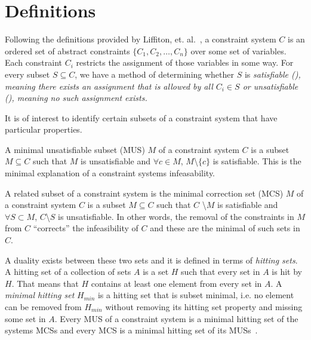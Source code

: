 \section{Definitions}
\label{sec:defs}
Following the definitions provided by Liffiton, et. al.~\cite{liffiton2016fast}, a constraint system $C$ is an ordered set of abstract constraints $\{C_1, C_2,\dots,C_n \}$ over some set of variables. Each constraint $C_i$ restricts the assignment of those variables in some way. For every subset $S \subseteq C$, we have a method of determining whether $S$ is \em{satisfiable} (\sat), meaning there exists an assignment that is allowed by all $C_i \in S$ or \em{unsatisfiable} (\unsat), meaning no such assignment exists. 

It is of interest to identify certain subsets of a constraint system that have particular properties. 

A minimal unsatisfiable subset (MUS) $M$ of a constraint system $C$ is a subset $M \subseteq C$ such that  $M$ is unsatisfiable and $\forall c \in M$, $M$\textbackslash $\{c\}$ is satisfiable. This is the minimal explanation of a constraint systems infeasability. 

A related subset of a constraint system is the minimal correction set (MCS) $M$ of a constraint system $C$ is a subset $M \subseteq C$ such that  $C$ \textbackslash $M$ is satisfiable and $\forall S \subset M$, $C$\textbackslash $S$ is unsatisfiable. In other words, the removal of the constraints in $M$ from $C$ ``corrects'' the infeasibility of $C$ and these are the minimal of such sets in $C$.

A duality exists between these two sets and it is defined in terms of {\em hitting sets}. A hitting set of a collection of sets $A$ is a set $H$ such that every set in $A$ is hit by $H$. That means that $H$ contains at least one element from every set in $A$. A {\em minimal hitting set} $H_{min}$ is a hitting set that is subset minimal, i.e. no element can be removed from $H_{min}$ without removing its hitting set property and missing some set in $A$. Every MUS of a constraint system is a minimal hitting set of the systems MCSs and every MCS is a minimal hitting set of its MUSs~\cite{reiter1987theory, de1987diagnosing, liffiton2016fast}. 



